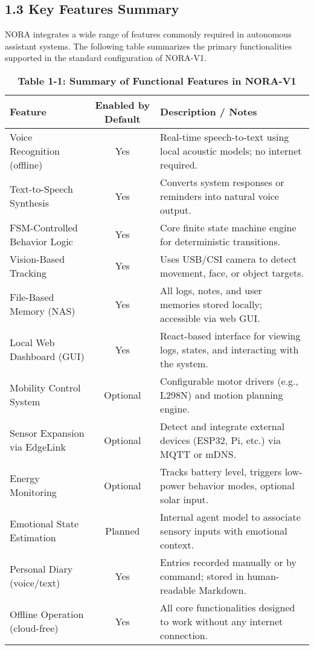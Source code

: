 \subsection*{1.3 Key Features Summary}

NORA integrates a wide range of features commonly required in autonomous assistant systems. The following table summarizes the primary functionalities supported in the standard configuration of NORA-V1.

\vspace{0.5cm}

\begin{table}[H]
\centering
\renewcommand{\arraystretch}{1.4}
\begin{tabular}{|p{6cm}|c|p{6cm}|}
\hline
\textbf{Feature} & \textbf{Enabled by Default} & \textbf{Description / Notes} \\
\hline
Voice Recognition (offline) & Yes & Real-time speech-to-text using local acoustic models; no internet required. \\
\hline
Text-to-Speech Synthesis & Yes & Converts system responses or reminders into natural voice output. \\
\hline
FSM-Controlled Behavior Logic & Yes & Core finite state machine engine for deterministic transitions. \\
\hline
Vision-Based Tracking & Yes & Uses USB/CSI camera to detect movement, face, or object targets. \\
\hline
File-Based Memory (NAS) & Yes & All logs, notes, and user memories stored locally; accessible via web GUI. \\
\hline
Local Web Dashboard (GUI) & Yes & React-based interface for viewing logs, states, and interacting with the system. \\
\hline
Mobility Control System & Optional & Configurable motor drivers (e.g., L298N) and motion planning engine. \\
\hline
Sensor Expansion via EdgeLink & Optional & Detect and integrate external devices (ESP32, Pi, etc.) via MQTT or mDNS. \\
\hline
Energy Monitoring & Optional & Tracks battery level, triggers low-power behavior modes, optional solar input. \\
\hline
Emotional State Estimation & Planned & Internal agent model to associate sensory inputs with emotional context. \\
\hline
Personal Diary (voice/text) & Yes & Entries recorded manually or by command; stored in human-readable Markdown. \\
\hline
Offline Operation (cloud-free) & Yes & All core functionalities designed to work without any internet connection. \\
\hline
\end{tabular}
\caption*{\textbf{Table 1-1: Summary of Functional Features in NORA-V1}}
\end{table}
